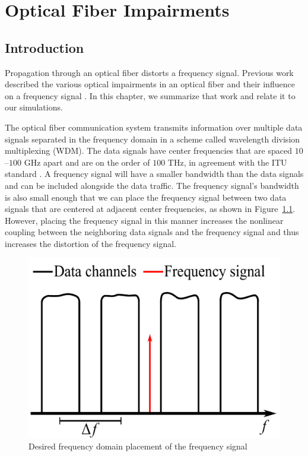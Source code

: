
\chapter{Optical Fiber Impairments}
\label{chap:fiber_impairments}


\section{Introduction}

Propagation through an optical fiber distorts a frequency signal. Previous work described the various optical impairments in an optical fiber and their influence on a frequency signal \cite{menyukIFCS2015}. In this chapter, we summarize that work and relate it to our simulations.

The optical fiber communication system transmits information over multiple data signals separated in the frequency domain in a scheme called wavelength division multiplexing (WDM). The data signals have center frequencies that are spaced $10$--$100$ GHz apart and are on the order of $100$ THz, in agreement with the ITU standard \cite{ITU-T2012}. A frequency signal will have a smaller bandwidth than the data signals and can be included alongside the data traffic. The frequency signal's bandwidth is also small enough that we can place the frequency signal between two data signals that are centered at adjacent center frequencies, as shown in Figure~\ref{fig:system}. However, placing the frequency signal in this manner increases the nonlinear coupling between the neighboring data signals and the frequency signal and thus increases the distortion of the frequency signal.

\begin{figure}
	\centering
	\includegraphics[scale=0.6]{img/system.pdf}
	\caption{Desired frequency domain placement of the frequency signal}	\label{fig:system}
\end{figure}


